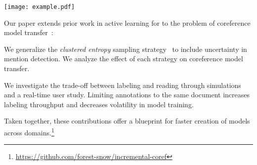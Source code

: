 \begin{figure*}
    \center
    \texttt{[image: example.pdf]}
    \caption{
        \coref{} models are trained on \textbf{source} domain \ontonotes{}, which contains data like
        news articles. The \textbf{source}
        document links ``the bonds'' to ``municipal bonds''.
        In a \textbf{target} domain like \preco{}~\citep{chen-2018-preco}, ``the bonds'' may no longer
        have the same meaning. It can refer to
        ``chemical bonds'' (Document 1) or not be considered an entity (Document 2).
        A solution is to continue training the \textbf{source} model on more spans
        from the \textbf{target} domain. Active learning helps select
        ambiguous spans, like ``the bonds'', for the user to label on this interface (Section~\ref{ssec:human_labeling}).
    }
    \label{fig:example}
  \end{figure*}


Our paper extends prior work in active
learning for \coref{} to the problem of coreference model
transfer~\citep{xia-2021}:
\begin{enumerate*}
    \item We generalize the \emph{clustered entropy} sampling
        strategy~\citep{li-2020} to include uncertainty in mention detection. We analyze the effect of
        each strategy on coreference model transfer.
    \item We investigate the trade-off between labeling and reading
    through simulations and a real-time user study.
    Limiting annotations to the same document
    increases labeling throughput and decreases volatility in model
    training.
\end{enumerate*}
Taken together, these contributions offer a blueprint for faster creation of \coref{} models
across domains.\footnote{\url{https://github.com/forest-snow/incremental-coref}}


